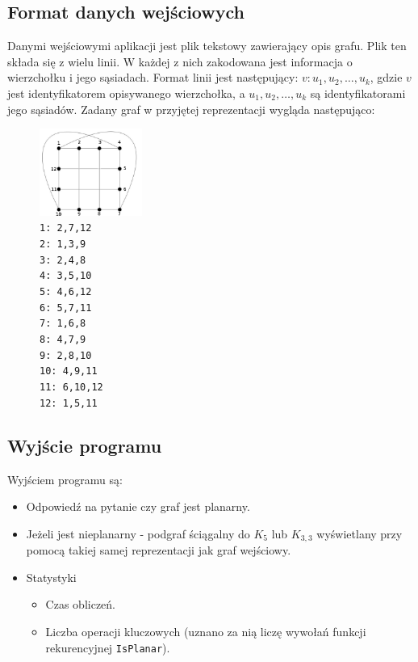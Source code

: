 \documentclass[a4 122pt]{article}
\begin{document}
	\subsection{Format danych wejściowych}
		Danymi wejściowymi aplikacji jest plik tekstowy zawierający opis grafu. Plik ten składa się z wielu linii. W każdej z nich zakodowana jest informacja o wierzchołku i jego sąsiadach. Format linii jest następujący:
		$v: u_1, u_2, \dots , u_k$, gdzie $v$ jest identyfikatorem opisywanego wierzchołka, a $u_1, u_2, \dots , u_k$ są identyfikatorami jego sąsiadów.
		Zadany graf w przyjętej reprezentacji wygląda następująco:
		\begin{figure}
			\centering
			\includegraphics[width=0.3\textwidth]{include/graf.png}
			\caption*
{
\texttt{1: 2,7,12\\
2: 1,3,9\\
3: 2,4,8\\
4: 3,5,10\\
5: 4,6,12\\
6: 5,7,11\\
7: 1,6,8\\
8: 4,7,9\\
9: 2,8,10\\
10: 4,9,11\\
11: 6,10,12\\
12: 1,5,11}}
		\end{figure}
	\subsection{Wyjście programu}
	Wyjściem programu są:
	\begin{itemize}
	\item Odpowiedź na pytanie czy graf jest planarny.
	\item Jeżeli jest nieplanarny -  podgraf ściągalny do $K_5$ lub $K_{3,3}$ wyświetlany przy pomocą takiej samej reprezentacji jak graf wejściowy.
	\item Statystyki
		\begin{itemize}
		\item Czas obliczeń.
		\item Liczba operacji kluczowych (uznano za nią liczę wywołań funkcji rekurencyjnej \texttt{IsPlanar}).
		\end{itemize}
	\end{itemize}
	
\end{document}
